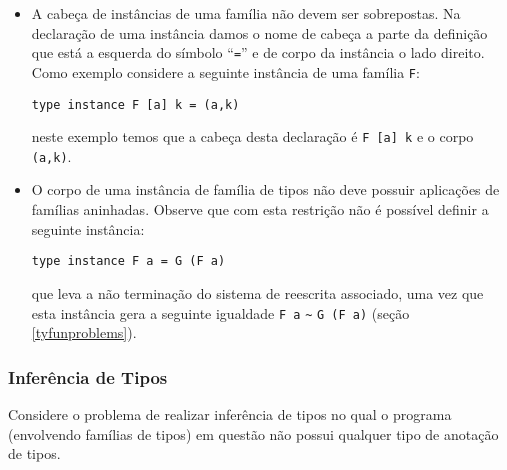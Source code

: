 \begin{itemize}
	\item A cabe\c{c}a de inst\^ancias de uma fam\'ilia n\~ao devem ser sobrepostas. Na declara\c{c}\~ao de uma
	      inst\^ancia damos o nome de cabe\c{c}a a parte da defini\c{c}\~ao que est\'a a esquerda do s\'imbolo
	      ``\texttt{=}'' e de corpo da inst\^ancia o lado direito. Como exemplo considere a seguinte inst\^ancia
	      de uma fam\'ilia \texttt{F}:
	      \begin{center}
	      	\texttt{type instance F [a] k = (a,k)}
	      \end{center}
	      neste exemplo temos que a cabe\c{c}a desta declara\c{c}\~ao \'e \texttt{F [a] k} e o corpo \texttt{(a,k)}.
    \item O corpo de uma inst\^ancia de fam\'ilia de tipos n\~ao deve possuir aplica\c{c}\~oes de fam\'ilias aninhadas.
          Observe que com esta restri\c{c}\~ao n\~ao \'e poss\'ivel definir a seguinte inst\^ancia:
          \begin{center}
          	\texttt{type instance F a = G (F a)}
          \end{center}
          que leva a n\~ao termina\c{c}\~ao do sistema de reescrita associado, uma vez que
          esta inst\^ancia gera a seguinte igualdade \texttt{F a} \verb|~| \texttt{G (F a)}
          (se\c{c}\~ao \ref{tyfunproblems}).
\end{itemize}

\subsubsection{Infer\^encia de Tipos}

Considere o problema de realizar infer\^encia de tipos no qual o programa (envolvendo fam\'ilias de tipos) em quest\~ao 
n\~ao possui qualquer tipo de anota\c{c}\~ao de tipos. 

